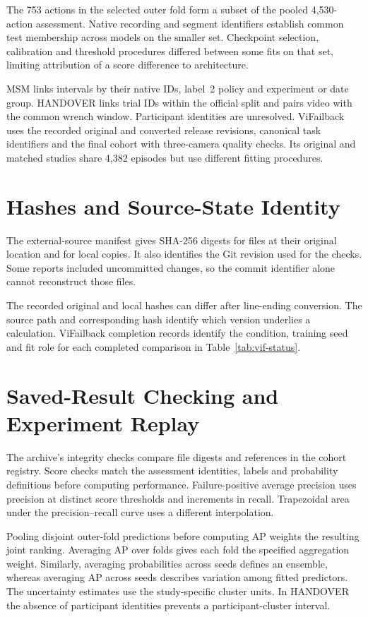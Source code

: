 The 753 actions in the selected outer fold form a subset of the pooled 4,530-action
assessment. Native recording and segment identifiers establish common test membership
across models on the smaller set. Checkpoint selection, calibration and threshold
procedures differed between some fits on that set, limiting attribution of a score
difference to architecture.

MSM links intervals by their native IDs, label~2 policy and experiment or date group.
HANDOVER links trial IDs within the official split and pairs video with the common
wrench window. Participant identities are unresolved. ViFailback uses the recorded
original and converted release revisions, canonical task identifiers and the final
cohort with three-camera quality checks. Its original and matched studies share 4,382
episodes but use different fitting procedures.

\section{Hashes and Source-State Identity}
The external-source manifest gives SHA-256 digests for files at their original location
and for local copies. It also identifies the Git revision used for the checks. Some reports
included uncommitted changes, so the commit identifier alone cannot reconstruct those
files.

The recorded original and local hashes can differ after line-ending conversion. The
source path and corresponding hash identify which version underlies a calculation.
ViFailback completion records identify the condition, training seed and fit role for
each completed comparison in Table~\ref{tab:vif-status}.

\section{Saved-Result Checking and Experiment Replay}
The archive's integrity checks compare file digests and references in the cohort
registry. Score checks match the assessment identities, labels and probability
definitions before computing performance. Failure-positive average precision uses
precision at distinct score thresholds and increments in recall. Trapezoidal area under
the precision--recall curve uses a different interpolation.

Pooling disjoint outer-fold predictions before computing AP weights the resulting joint
ranking. Averaging AP over folds gives each fold the specified aggregation weight.
Similarly, averaging probabilities across seeds defines an ensemble, whereas averaging
AP across seeds describes variation among fitted predictors. The uncertainty estimates
use the study-specific cluster units. In HANDOVER the absence of participant identities
prevents a participant-cluster interval.

